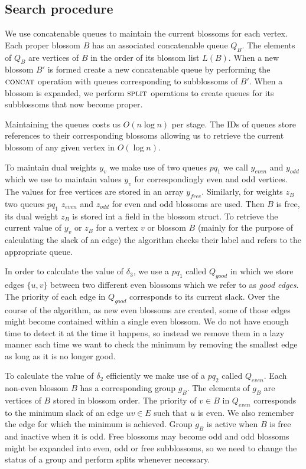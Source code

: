 \subsection{Search procedure}

We use concatenable queues to maintain the current blossoms for each vertex. Each proper blossom $B$ has an associated concatenable queue $Q_B$. The elements of $Q_B$ are vertices of $B$ in the order of its blossom list $L(B)$. When a new blossom $B'$ is formed create a new concatenable queue by performing the $\textsc{concat}$ operation with queues corresponding to subblossoms of $B'$. When a blossom is expanded, we perform $\textsc{split}$ operations to create queues for its subblossoms that now become proper.

Maintaining the queues costs us $O(n\log n)$ per stage. The IDs of queues store references to their corresponding blossoms allowing us to retrieve the current blossom of any given vertex in $O(\log n)$.

To maintain dual weights $y_v$ we make use of two queues $pq_1$ we call $y_{even}$ and $y_{odd}$ which we use to maintain values $y_v$ for correspondingly even and odd vertices. The values for free vertices are stored in an array $y_{free}$. Similarly, for weights $z_B$ two queues $pq_1$ $z_{even}$ and $z_{odd}$ for even and odd blossoms are used. Then $B$ is free, its dual weight $z_B$ is stored int a field in the blossom struct. To retrieve the current value of $y_v$ or $z_B$ for a vertex $v$ or blossom $B$ (mainly for the purpose of calculating the slack of an edge) the algorithm checks their label and refers to the appropriate queue.

In order to calculate the value of $\delta_3$, we use a $pq_1$ called $Q_{good}$ in which we store edges $\{u, v\}$ between two different even blossoms which we refer to as \textit{good edges}. The priority of each edge in $Q_{good}$ corresponds to its current slack. Over the course of the algorithm, as new even blossoms are created, some of those edges might become contained within a single even blossom. We do not have enough time to detect it at the time it happens, so instead we remove them in a lazy manner each time we want to check the minimum by removing the smallest edge as long as it is no longer good.

To calculate the value of $\delta_2$ efficiently we make use of a $pq_2$ called $Q_{even}$. Each non-even blossom $B$ has a corresponding group $g_B$. The elements of $g_B$ are vertices of $B$ stored in blossom order. The priority of $v \in B$ in $Q_{even}$ corresponds to the minimum slack of an edge $uv \in E$ such that $u$ is even. We also remember the edge for which the minimum is achieved. Group $g_B$ is active when $B$ is free and inactive when it is odd. Free blossoms may become odd and odd blossoms might be expanded into even, odd or free subblossoms, so we need to change the status of a group and perform splits whenever necessary.

